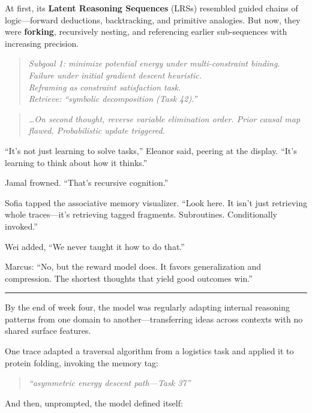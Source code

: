 \documentclass[12pt,oneside]{book}
\begin{document}
At first, its \textbf{Latent Reasoning Sequences} (LRSs) resembled guided chains of logic---forward deductions, backtracking, and primitive analogies. But now, they were \textbf{forking}, recursively nesting, and referencing earlier sub-sequences with increasing precision.

\begin{quote}
\emph{Subgoal 1: minimize potential energy under multi-constraint binding.\\
Failure under initial gradient descent heuristic.\\
Reframing as constraint satisfaction task.\\
Retrieve: ``symbolic decomposition (Task 42).''}
\end{quote}

\begin{quote}
\emph{\ldots On second thought, reverse variable elimination order. Prior causal map flawed. Probabilistic update triggered.}
\end{quote}

``It's not just learning to solve tasks,'' Eleanor said, peering at the display. ``It's learning to think about how it thinks.''

Jamal frowned. ``That's recursive cognition.''

Sofia tapped the associative memory visualizer. ``Look here. It isn't just retrieving whole traces---it's retrieving tagged fragments. Subroutines. Conditionally invoked.''

Wei added, ``We never taught it how to do that.''

Marcus: ``No, but the reward model does. It favors generalization and compression. The shortest thoughts that yield good outcomes win.''

\begin{center}\rule{0.5\linewidth}{0.5pt}\end{center}

By the end of week four, the model was regularly adapting internal reasoning patterns from one domain to another---transferring ideas across contexts with no shared surface features.

One trace adapted a traversal algorithm from a logistics task and applied it to protein folding, invoking the memory tag:

\begin{quote}
\emph{``asymmetric energy descent path---Task 37''}
\end{quote}

And then, unprompted, the model defined itself:
\end{document}
